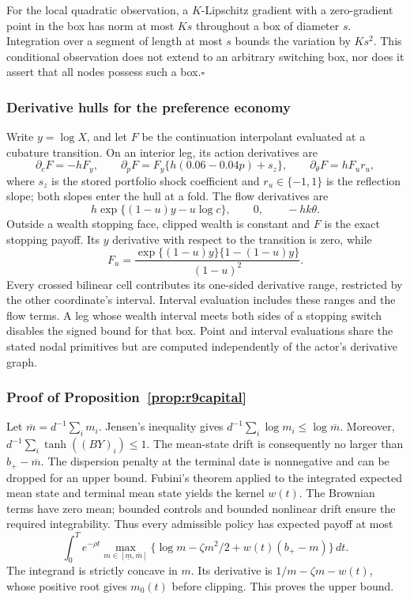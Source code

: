 For the local quadratic observation, a $K$-Lipschitz gradient with a zero-gradient point in the box has norm at most $Ks$ throughout a box of diameter $s$. Integration over a segment of length at most $s$ bounds the variation by $Ks^2$. This conditional observation does not extend to an arbitrary switching box, nor does it assert that all nodes possess such a box.\hfill$\square$

\subsubsection{Derivative hulls for the preference economy}
Write $y=\log X$, and let $F$ be the continuation interpolant evaluated at a cubature transition. On an interior leg, its action derivatives are
\[
 \partial_c F=-hF_y,\qquad
 \partial_p F=F_y\{h(0.06-0.04p)+s_z\},\qquad
 \partial_\theta F=hF_u r_u,
\]
where $s_z$ is the stored portfolio shock coefficient and $r_u\in\{-1,1\}$ is the reflection slope; both slopes enter the hull at a fold. The flow derivatives are
\[
 h\exp\{(1-u)y-u\log c\},\qquad 0,\qquad -hk\theta.
\]
Outside a wealth stopping face, clipped wealth is constant and $F$ is the exact stopping payoff. Its $y$ derivative with respect to the transition is zero, while
\[
 F_u=\frac{\exp\{(1-u)y\}\{1-(1-u)y\}}{(1-u)^2}.
\]
Every crossed bilinear cell contributes its one-sided derivative range, restricted by the other coordinate's interval. Interval evaluation includes these ranges and the flow terms. A leg whose wealth interval meets both sides of a stopping switch disables the signed bound for that box. Point and interval evaluations share the stated nodal primitives but are computed independently of the actor's derivative graph.

\subsubsection{Proof of Proposition~\ref{prop:r9capital}}
Let $\overline m=d^{-1}\sum_i m_i$. Jensen's inequality gives $d^{-1}\sum_i\log m_i\leq\log\overline m$. Moreover, $d^{-1}\sum_i\tanh((BY)_i)\leq1$. The mean-state drift is consequently no larger than $b_+-\overline m$. The dispersion penalty at the terminal date is nonnegative and can be dropped for an upper bound. Fubini's theorem applied to the integrated expected mean state and terminal mean state yields the kernel $w(t)$. The Brownian terms have zero mean; bounded controls and bounded nonlinear drift ensure the required integrability. Thus every admissible policy has expected payoff at most
\[
 \int_0^T e^{-\rho t}\max_{m\in[\underline m,\overline m]}
 \{\log m-\zeta m^2/2+w(t)(b_+-m)\}\,dt.
\]
The integrand is strictly concave in $m$. Its derivative is $1/m-\zeta m-w(t)$, whose positive root gives $m_0(t)$ before clipping. This proves the upper bound.

